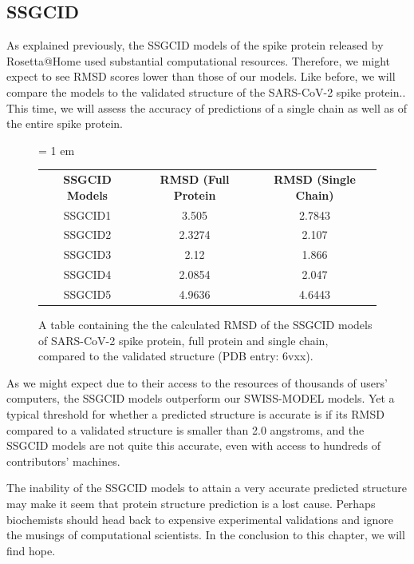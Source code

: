 \begin{qbox}\end{qbox}

\FloatBarrier
{}
\subsection{SSGCID}

As explained previously, the SSGCID models of the spike protein released by Rosetta@Home used substantial computational resources. Therefore, we might expect to see RMSD scores lower than those of our models. Like before, we will compare the models to the validated structure of the SARS-CoV-2 spike protein.. This time, we will assess the accuracy of predictions of a single chain as well as of the entire spike protein.

\begin{figure}[h]
	\centering
	\tabcolsep = 1 em
	\mySfFamily
	\begin{tabular}{c c c}
		\textbf{SSGCID Models} & \textbf{RMSD (Full Protein} & \textbf{RMSD (Single Chain)} \\
		SSGCID1  & 3.505 & 2.7843 \\
		SSGCID2  & 2.3274 & 2.107 \\
		SSGCID3  & 2.12 & 1.866 \\
		SSGCID4  & 2.0854 & 2.047 \\
		SSGCID5  & 4.9636 & 4.6443 \\
	\end{tabular}
	\caption{A table containing the the calculated RMSD of the SSGCID models of SARS-CoV-2 spike protein, full protein and single chain, compared to the validated structure (PDB entry: 6vxx).}
	\label{fig:ssgcid_rmsd_table}
\end{figure}

As we might expect due to their access to the resources of thousands of users' computers, the SSGCID models outperform our SWISS-MODEL models. Yet a typical threshold for whether a predicted structure is accurate is if its RMSD compared to a validated structure is smaller than 2.0 angstroms, and the SSGCID models are not quite this accurate, even with access to hundreds of contributors' machines.

The inability of the SSGCID models to attain a very accurate predicted structure may make it seem that protein structure prediction is a lost cause. Perhaps biochemists should head back to expensive experimental validations and ignore the musings of computational scientists. In the conclusion to this chapter, we will find hope.\\

